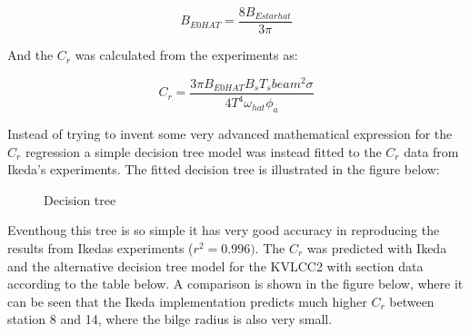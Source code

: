     
 
            
    
    \begin{equation}
B_{E0 HAT} = \frac{8 B_{E star hat}}{3 \pi}
\label{eq:equation}
\end{equation}

    

    And the \(C_r\) was calculated from the experiments as:
 
            
    
    \begin{equation}
C_{r} = \frac{3 \pi B_{E0 HAT} B_{s} T_{s} beam^{2} \sigma}{4 T^{4} \omega_{hat} \phi_{a}}
\label{eq:equation}
\end{equation}

    

    Instead of trying to invent some very advanced mathematical expression
for the \(C_r\) regression a simple decision tree model was instead
fitted to the \(C_r\) data from Ikeda's experiments. The fitted decision
tree is illustrated in the figure below:

    \begin{figure}
        \begin{center}\end{center}
        \caption{Decision tree}
        \label{fig:decision_tree}
    \end{figure}
    
    Eventhoug this tree is so simple it has very good accuracy in
reproducing the results from Ikedas experiments (\(r^2=0.996)\). The
\(C_r\) was predicted with Ikeda and the alternative decision tree model
for the KVLCC2 with section data according to the table below. A
comparison is shown in the figure below, where it can be seen that the
Ikeda implementation predicts much higher \(C_r\) between station 8 and
14, where the bilge radius is also very small.
 
            
    
